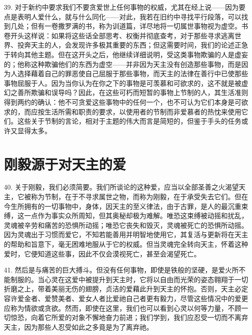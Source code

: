 39. 对于新约中要求我们不要贪爱世上任何事物的权威，尤其在经上说——因为要点是表明人爱什么，就与什么同化——对此，我若在旧约中寻找平行段落，可以找到几处；但有一卷撒罗满的书，称为训道篇，详尽地将一切属世事物视为虚空。书卷开头这样说：如果将这些话全部思考、权衡并彻底查考，对于那些寻求逃离世界、投奔天主的人，会发现许多极其重要的东西；但这需要时间，我们的论述正急于转向其他主题。但在这开头之后，他继续详细说明，受这类事物欺骗的人是虚妄的；他称这种欺骗他们的东西为虚空——并非因为天主没有创造那些事物，而是因为人选择藉着自己的罪恶使自己屈服于那些事物，而天主的法律在善行中已使那些事物屈服于人。因为当你认为在你之下的事物是可羡慕和可欲求的，这不就是被虚幻之善所欺骗和误导吗？因此，在这些可朽而短暂的事物上节制的人，其生活准则得到两约的确认：他不可贪爱这些事物中的任何一个，也不可认为它们本身是可欲求的，而应按生活所需和职责的要求，以使用者的节制而非爱慕者的热忱来使用它们。这些关于节制的言论，相对于主题的伟大而言是简短的，但鉴于手头的任务或许又显得太多。\par


\section{刚毅源于对天主的爱}

40. 关于刚毅，我们必须简要。我们所谈论的这种爱，应当以全部圣善之火渴望天主，它被称为节制，在于不寻求属世之物，而称为刚毅，在于承受失去它们。但在今生所拥有的一切事物中，身体，因天主的至义律法，由于古罪，是人的最沉重束缚，这一点作为事实众所周知，但其奥秘却极为难解。唯恐这束缚被动摇和扰乱，灵魂被辛劳和痛苦的恐惧所动摇；唯恐它丧失和毁灭，灵魂被死亡的恐惧所动摇。因为灵魂出于习惯而爱它，不知若能善用并明智地使用它，其复活与更新将在天主的帮助和旨意下，毫无困难地服从于它的权威。但当灵魂完全转向天主，怀着这种爱时，它便知道这些事，因此不仅会漠视死亡，甚至会渴望死亡。\par

41. 然后是与痛苦的巨大搏斗。但没有任何事物，即使是铁般的坚硬，是爱火所不能制服的。当心灵在这爱中被提升到天主时，它将以自由而光荣的姿态翱翔于一切折磨之上，带着美丽无伤的翅膀，贞洁的爱藉此升到天主的怀抱。否则，天主必定容许爱金者、爱赞美者、爱女人者比爱祂自己者更有毅力，尽管这些情况中的爱更应称为情欲或贪欲。然而，即使在这里，我们也可以看到心灵以何等力量，不顾一切惊恐，向着它所爱的对象不懈地奋力前进；我们学到，我们应忍受一切而不离弃天主，因为那些人忍受如此之多竟是为了离弃祂。\par

